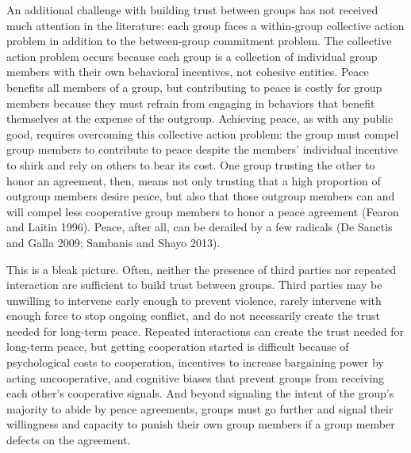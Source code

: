 \documentclass[11pt]{article}
\begin{document}
An additional challenge with building trust between groups has not
received much attention in the literature: each group faces a
within-group collective action problem in addition to the between-group
commitment problem. The collective action problem occurs because each
group is a collection of individual group members with their own
behavioral incentives, not cohesive entities. Peace benefits all members
of a group, but contributing to peace is costly for group members
because they must refrain from engaging in behaviors that benefit
themselves at the expense of the outgroup. Achieving peace, as with any
public good, requires overcoming this collective action problem: the
group must compel group members to contribute to peace despite the
members' individual incentive to shirk and rely on others to bear its
cost. One group trusting the other to honor an agreement, then, means
not only trusting that a high proportion of outgroup members desire
peace, but also that those outgroup members can and will compel less
cooperative group members to honor a peace agreement (Fearon and Laitin
1996). Peace, after all, can be derailed by a few radicals (De Sanctis
and Galla 2009; Sambanis and Shayo 2013).

This is a bleak picture. Often, neither the presence of third parties
nor repeated interaction are sufficient to build trust between groups.
Third parties may be unwilling to intervene early enough to prevent
violence, rarely intervene with enough force to stop ongoing conflict,
and do not necessarily create the trust needed for long-term peace.
Repeated interactions can create the trust needed for long-term peace,
but getting cooperation started is difficult because of psychological
costs to cooperation, incentives to increase bargaining power by acting
uncooperative, and cognitive biases that prevent groups from receiving
each other's cooperative signals. And beyond signaling the intent of the
group's majority to abide by peace agreements, groups must go further
and signal their willingness and capacity to punish their own group
members if a group member defects on the agreement.
\end{document}
